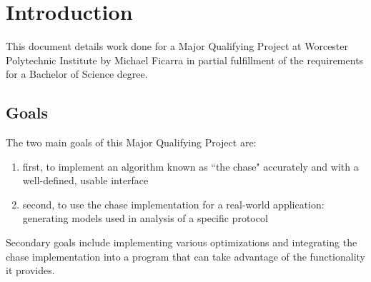 \section{Introduction}

	This document details work done for a Major Qualifying Project at Worcester
	Polytechnic Institute by Michael Ficarra in partial fulfillment of the
	requirements for a Bachelor of Science degree.

	\subsection{Goals}

		The two main goals of this Major Qualifying Project are:

		\begin{enumerate}
		\item first, to implement an algorithm known as ``the chase" accurately
		and with a well-defined, usable interface
		\item second, to use the chase implementation for a real-world
		application: generating models used in analysis of a specific protocol
		\end{enumerate}

		Secondary goals include implementing various optimizations and
		integrating the chase implementation into a program that can take
		advantage of the functionality it provides.
